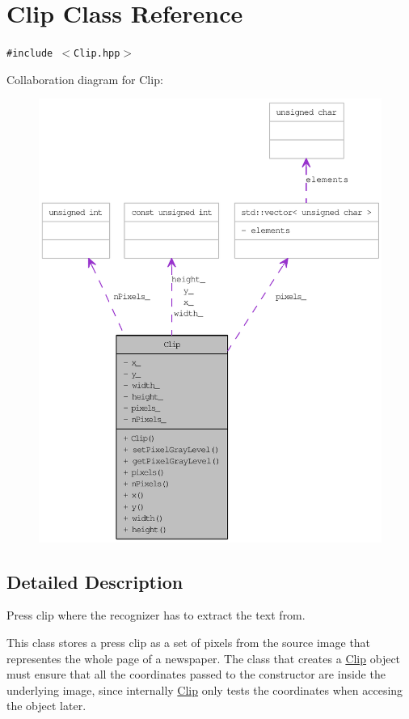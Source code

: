 \hypertarget{class_clip}{
\section{Clip Class Reference}
\label{class_clip}
}
{\tt \#include $<$Clip.hpp$>$}

Collaboration diagram for Clip:\nopagebreak
\begin{figure}[H]
\begin{center}
\leavevmode
\includegraphics[width=400pt]{class_clip__coll__graph}
\end{center}
\end{figure}


\subsection{Detailed Description}
Press clip where the recognizer has to extract the text from. 

This class stores a press clip as a set of pixels from the source image that representes the whole page of a newspaper. The class that creates a \hyperlink{class_clip}{Clip} object must ensure that all the coordinates passed to the constructor are inside the underlying image, since internally \hyperlink{class_clip}{Clip} only tests the coordinates when accesing the object later.

